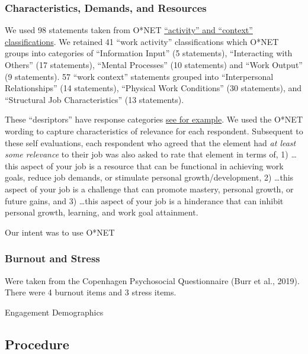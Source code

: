 \documentclass[
  english,
  man]{apa6}
\begin{document}
\hypertarget{characteristics-demands-and-resources}{%
\subsubsection{Characteristics, Demands, and Resources}\label{characteristics-demands-and-resources}}

We used 98 statements taken from O*NET \href{https://www.O*NETonline.org/find/descriptor/result/4.A.1.b.3}{\enquote{activity} and \enquote{context} classifications}. We retained 41 \enquote{work activity} classifications which O*NET groups into categories of \enquote{Information Input} (5 statements), \enquote{Interacting with Others} (17 statements), \enquote{Mental Processes} (10 statements) and \enquote{Work Output} (9 statements). 57 \enquote{work context} statements grouped into \enquote{Interpersonal Relationships} (14 statements), \enquote{Physical Work Conditions} (30 statements), and \enquote{Structural Job Characteristics} (13 statements).

These \enquote{desriptors} have response categories \href{https://www.O*NETonline.org/find/descriptor/result/4.C.1.c.2}{see for example}. We used the O*NET wording to capture characteristics of relevance for each respondent. Subsequent to these self evaluations, each respondent who agreed that the element had \emph{at least some relevance} to their job was also asked to rate that element in terms of, 1) \ldots this aspect of your job is a resource that can be functional in achieving work goals, reduce job demands, or stimulate personal growth/development, 2) \ldots this aspect of your job is a challenge that can promote mastery, personal growth, or future gains, and 3) \ldots this aspect of your job is a hinderance that can inhibit personal growth, learning, and work goal attainment.

Our intent was to use O*NET

\hypertarget{burnout-and-stress}{%
\subsubsection{Burnout and Stress}\label{burnout-and-stress}}

Were taken from the Copenhagen Psychosocial Questionnaire (Burr et al., 2019). There were 4 burnout items and 3 stress items.

Engagement
Demographics

\hypertarget{procedure}{%
\subsection{Procedure}\label{procedure}}
\end{document}

